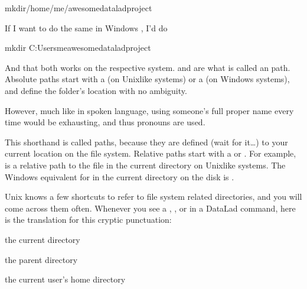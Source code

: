 \begin{sphinxVerbatim}[commandchars=\\\{\}]
mkdir/home/me/awesome\PYGZus{}datalad\PYGZus{}project
\end{sphinxVerbatim}

\sphinxAtStartPar
If I want to do the same in Windows , I’d do

\begin{sphinxVerbatim}[commandchars=\\\{\}]
\PYGZdl{} mkdir C:\PYGZbs{}Users\PYGZbs{}me\PYGZbs{}awesome\PYGZus{}datalad\PYGZus{}project
\end{sphinxVerbatim}

\sphinxAtStartPar
And that both works on the respective system.  and  are what is called an 
path.
Absolute paths  start with a \sphinxcode{\sphinxupquote{/}} (on Unix\sphinxhyphen{}like systems) or a \sphinxcode{\sphinxupquote{\textbackslash{}}} (on Windows systems), and define the folder’s location with no ambiguity.

\sphinxAtStartPar
However, much like in spoken language, using someone’s full proper name every
time would be exhausting, and thus pronouns are used.

\sphinxAtStartPar
This shorthand is called  paths, because they are defined (wait for it…)
 to your current location on the file system. Relative paths  start
with a \sphinxcode{\sphinxupquote{/}} or \sphinxcode{\sphinxupquote{\textbackslash{}}}.
For example,  is a relative path to the file  in the current directory on Unix\sphinxhyphen{}like systems.
The Windows equivalent for  in the current directory on the  disk is .

\sphinxAtStartPar
Unix knows a few shortcuts to refer to file system related directories, and you will
come across them often. Whenever you see a , , or \sphinxcode{\sphinxupquote{\textasciitilde{}}} in a DataLad command,
here is the translation for this cryptic punctuation:
\begin{description}
\sphinxAtStartPar
the current directory

\sphinxAtStartPar
the parent directory

\sphinxlineitem{\sphinxcode{\sphinxupquote{\textasciitilde{}}}}
\sphinxAtStartPar
the current user’s home directory

\end{description}

